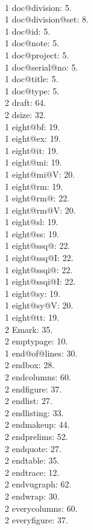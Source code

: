 \\1 doc@division: 5.
\\1 doc@division@set: 8.
\\1 doc@id: 5.
\\1 doc@note: 5.
\\1 doc@project: 5.
\\1 doc@serial@no: 5.
\\1 doc@title: 5.
\\1 doc@type: 5.
\\2 draft: 64.
\\2 dsize: 32.
\\1 eight@bf: 19.
\\1 eight@ex: 19.
\\1 eight@it: 19.
\\1 eight@mi: 19.
\\1 eight@mi@V: 20.
\\1 eight@rm: 19.
\\1 eight@rm@: 22.
\\1 eight@rm@V: 20.
\\1 eight@sl: 19.
\\1 eight@ss: 19.
\\1 eight@ssq@: 22.
\\1 eight@ssq@I: 22.
\\1 eight@ssqi@: 22.
\\1 eight@ssqi@I: 22.
\\1 eight@sy: 19.
\\1 eight@sy@V: 20.
\\1 eight@tt: 19.
\\2 Emark: 35.
\\2 emptypage: 10.
\\1 end@of@lines: 30.
\\2 endbox: 28.
\\2 endcolumns: 60.
\\2 endfigure: 37.
\\2 endlist: 27.
\\2 endlisting: 33.
\\2 endmakeup: 44.
\\2 endprelims: 52.
\\2 endquote: 27.
\\2 endtable: 35.
\\2 endtrace: 12.
\\2 endvugraph: 62.
\\2 endwrap: 30.
\\2 everycolumns: 60.
\\2 everyfigure: 37.
